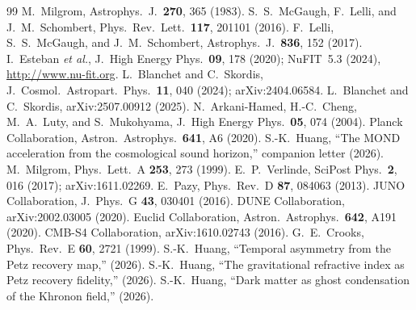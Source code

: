 \documentclass[prl,twocolumn,superscriptaddress,longbibliography]{revtex4-2}
\begin{document}
\begin{thebibliography}{99}
  M.~Milgrom, Astrophys.\ J.\ \textbf{270}, 365 (1983).
  S.~S.~McGaugh, F.~Lelli, and J.~M.~Schombert,
  Phys.\ Rev.\ Lett.\ \textbf{117}, 201101 (2016).
  F.~Lelli, S.~S.~McGaugh, and J.~M.~Schombert,
  Astrophys.\ J.\ \textbf{836}, 152 (2017).
  I.~Esteban \textit{et al.},
  J.\ High Energy Phys.\ \textbf{09}, 178 (2020);
  NuFIT~5.3 (2024), \url{http://www.nu-fit.org}.
  L.~Blanchet and C.~Skordis,
  J.\ Cosmol.\ Astropart.\ Phys.\ \textbf{11}, 040 (2024);
  arXiv:2404.06584.
  L.~Blanchet and C.~Skordis,
  arXiv:2507.00912 (2025).
  N.~Arkani-Hamed, H.-C.~Cheng, M.~A.~Luty, and S.~Mukohyama,
  J.\ High Energy Phys.\ \textbf{05}, 074 (2004).
  Planck Collaboration,
  Astron.\ Astrophys.\ \textbf{641}, A6 (2020).
  S.-K.~Huang,
  ``The MOND acceleration from the cosmological sound horizon,''
  companion letter (2026).
  M.~Milgrom,
  Phys.\ Lett.\ A \textbf{253}, 273 (1999).
  E.~P.~Verlinde,
  SciPost Phys.\ \textbf{2}, 016 (2017);
  arXiv:1611.02269.
  E.~Pazy,
  Phys.\ Rev.\ D \textbf{87}, 084063 (2013).
  JUNO Collaboration,
  J.\ Phys.\ G \textbf{43}, 030401 (2016).
  DUNE Collaboration,
  arXiv:2002.03005 (2020).
  Euclid Collaboration,
  Astron.\ Astrophys.\ \textbf{642}, A191 (2020).
  CMB-S4 Collaboration,
  arXiv:1610.02743 (2016).
  G.~E.~Crooks,
  Phys.\ Rev.\ E \textbf{60}, 2721 (1999).
  S.-K.~Huang,
  ``Temporal asymmetry from the Petz recovery map,''
  (2026).
  S.-K.~Huang,
  ``The gravitational refractive index as Petz recovery fidelity,''
  (2026).
  S.-K.~Huang,
  ``Dark matter as ghost condensation of the Khronon field,''
  (2026).
\end{thebibliography}
\end{document}
